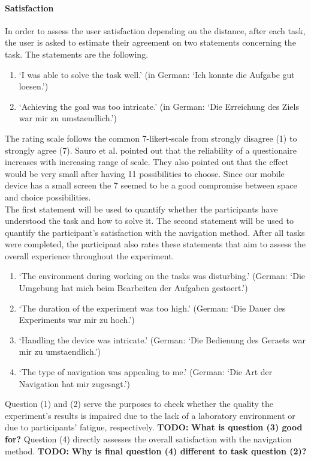 \documentclass{sig-alternate-05-2015}
\newcommand{\todo}{\textbf{TODO:} \textbf}
\begin{document}
\paragraph{Satisfaction}
In order to assess the user satisfaction depending on the distance, after each task, the user is asked to estimate their
agreement on two statements concerning the task. The statements are the following.
\begin{enumerate}
  \item `I was able to solve the task well.' (in German: `Ich konnte die Aufgabe gut loesen.')
  \item `Achieving the goal was too intricate.' (in German: `Die Erreichung des Ziels war mir zu umstaendlich.')
\end{enumerate}
The rating scale follows the common 7-likert-scale from strongly disagree (1) to strongly agree (7). Sauro et al. pointed out that the reliability of a questionaire increases with increasing range of scale. They also pointed out that the effect would be very small after having 11 possibilities to choose. Since our mobile device has a small screen the 7 seemed to be a good compromise between space and choice possibilities.\\
The first statement will be used to quantify whether the participants have understood the task and how to solve it. The second statement will
be used to quantify the participant's satisfaction with the navigation method.
After all tasks were completed, the participant also rates these statements that aim to assess the overall experience throughout the experiment.
\begin{enumerate}
  \item `The environment during working on the tasks was disturbing.' (German: `Die Umgebung hat mich beim Bearbeiten der Aufgaben gestoert.')
  \item `The duration of the experiment was too high.' (German: `Die Dauer des Experiments war mir zu hoch.')
  \item `Handling the device was intricate.' (German: `Die Bedienung des Geraets war mir zu umstaendlich.')
  \item `The type of navigation was appealing to me.' (German: `Die Art der Navigation hat mir zugesagt.')
\end{enumerate}
Question (1) and (2) serve the purposes to check whether the quality the experiment's results is impaired due to the lack of a laboratory environment or
due to participants' fatigue, respectively. \todo{What is question (3) good for?} Question (4) directly assesses the overall satisfaction with the navigation method.
\todo{Why is final question (4) different to task question (2)?}
\end{document}
